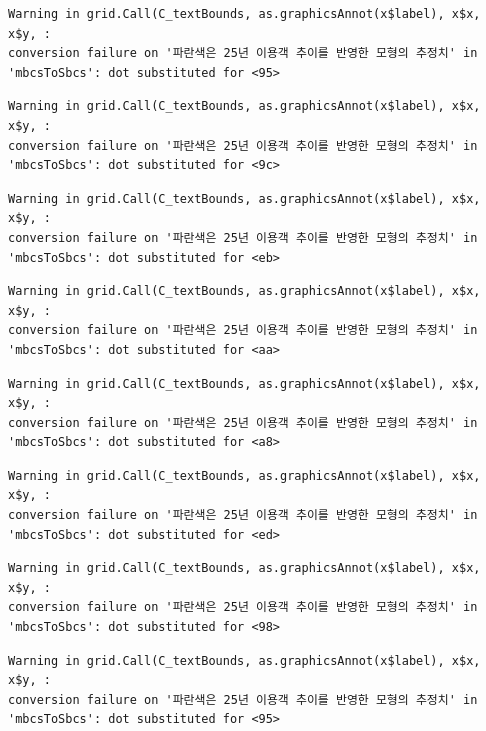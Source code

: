\documentclass[
  letterpaper,
  DIV=11,
  numbers=noendperiod]{scrreprt}
\begin{document}
\begin{verbatim}
Warning in grid.Call(C_textBounds, as.graphicsAnnot(x$label), x$x, x$y, :
conversion failure on '파란색은 25년 이용객 추이를 반영한 모형의 추정치' in
'mbcsToSbcs': dot substituted for <95>
\end{verbatim}

\begin{verbatim}
Warning in grid.Call(C_textBounds, as.graphicsAnnot(x$label), x$x, x$y, :
conversion failure on '파란색은 25년 이용객 추이를 반영한 모형의 추정치' in
'mbcsToSbcs': dot substituted for <9c>
\end{verbatim}

\begin{verbatim}
Warning in grid.Call(C_textBounds, as.graphicsAnnot(x$label), x$x, x$y, :
conversion failure on '파란색은 25년 이용객 추이를 반영한 모형의 추정치' in
'mbcsToSbcs': dot substituted for <eb>
\end{verbatim}

\begin{verbatim}
Warning in grid.Call(C_textBounds, as.graphicsAnnot(x$label), x$x, x$y, :
conversion failure on '파란색은 25년 이용객 추이를 반영한 모형의 추정치' in
'mbcsToSbcs': dot substituted for <aa>
\end{verbatim}

\begin{verbatim}
Warning in grid.Call(C_textBounds, as.graphicsAnnot(x$label), x$x, x$y, :
conversion failure on '파란색은 25년 이용객 추이를 반영한 모형의 추정치' in
'mbcsToSbcs': dot substituted for <a8>
\end{verbatim}

\begin{verbatim}
Warning in grid.Call(C_textBounds, as.graphicsAnnot(x$label), x$x, x$y, :
conversion failure on '파란색은 25년 이용객 추이를 반영한 모형의 추정치' in
'mbcsToSbcs': dot substituted for <ed>
\end{verbatim}

\begin{verbatim}
Warning in grid.Call(C_textBounds, as.graphicsAnnot(x$label), x$x, x$y, :
conversion failure on '파란색은 25년 이용객 추이를 반영한 모형의 추정치' in
'mbcsToSbcs': dot substituted for <98>
\end{verbatim}

\begin{verbatim}
Warning in grid.Call(C_textBounds, as.graphicsAnnot(x$label), x$x, x$y, :
conversion failure on '파란색은 25년 이용객 추이를 반영한 모형의 추정치' in
'mbcsToSbcs': dot substituted for <95>
\end{verbatim}
\end{document}
